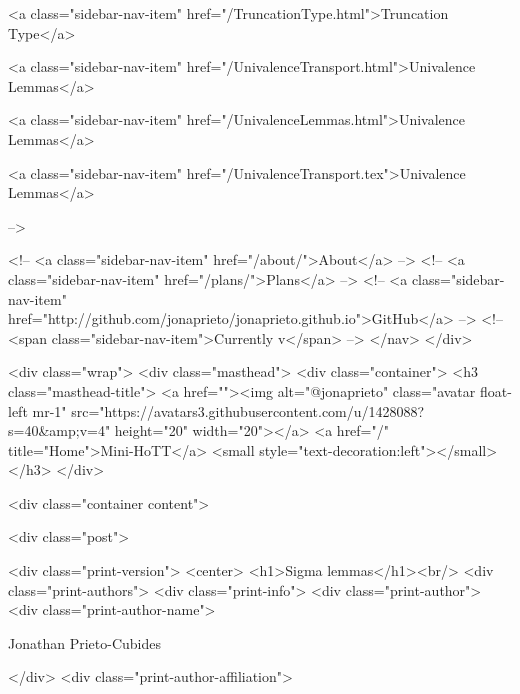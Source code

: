       
    
      
        
          <a class="sidebar-nav-item" href="/TruncationType.html">Truncation Type</a>
        
      
    
      
        
          <a class="sidebar-nav-item" href="/UnivalenceTransport.html">Univalence Lemmas</a>
        
      
    
      
        
          <a class="sidebar-nav-item" href="/UnivalenceLemmas.html">Univalence Lemmas</a>
        
      
    
      
        
          <a class="sidebar-nav-item" href="/UnivalenceTransport.tex">Univalence Lemmas</a>
        
      
     -->

    <!-- <a class="sidebar-nav-item" href="/about/">About</a> -->
    <!-- <a class="sidebar-nav-item" href="/plans/">Plans</a> -->
    <!-- <a class="sidebar-nav-item" href="http://github.com/jonaprieto/jonaprieto.github.io">GitHub</a> -->
    <!-- <span class="sidebar-nav-item">Currently v</span> -->
  </nav>
</div>

    <div class="wrap">
      <div class="masthead">
        <div class="container">
          <h3 class="masthead-title">
            <a href=""><img alt="@jonaprieto" class="avatar float-left mr-1" src="https://avatars3.githubusercontent.com/u/1428088?s=40&amp;v=4" height="20" width="20"></a>
            <a href="/" title="Home">Mini-HoTT</a>
            <small style="text-decoration:left"></small>
          </h3>
        </div>
      
      <div class="container content">
        







<div class="post">

  <div class="print-version">
    <center>
      <h1>Sigma lemmas</h1><br/>
        <div class="print-authors">
          <div class="print-info">
            <div class="print-author">
              <div class="print-author-name">
                
                  Jonathan Prieto-Cubides
                
              </div>
              <div class="print-author-affiliation">
                
